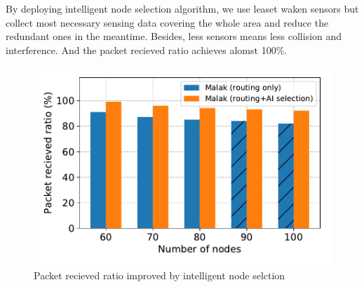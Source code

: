 By deploying intelligent node selection algorithm, we use leaset waken sensors
but collect most necessary sensing data covering the whole area and reduce the
redundant ones in the meantime. Besides, less sensors means less collision and
interference. And the packet recieved ratio achieves alomst 100\%.

\begin{figure}[htbp]
	\centering
	\includegraphics[width=.95\columnwidth]{Figure/ai_selection}
	\vspace{-0.1in}
	\caption{Packet recieved ratio improved by intelligent node selction
		\textnormal{
		}}
	\label{fig:ai_selection}
\end{figure}


